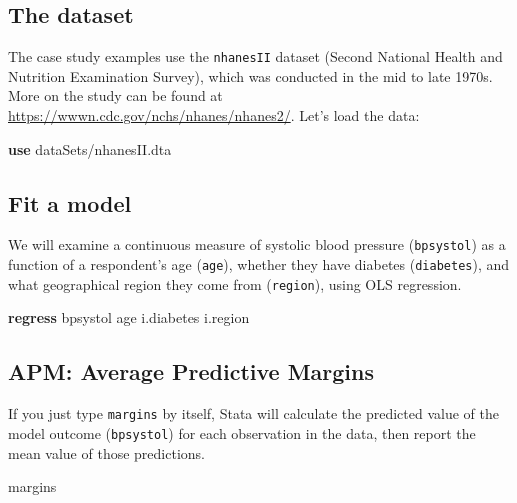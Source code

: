 \documentclass[
]{book}
\newenvironment{Shaded}{\begin{snugshade}}{\end{snugshade}}
\newcommand{\KeywordTok}[1]{\textcolor[rgb]{0.13,0.29,0.53}{\textbf{#1}}}
\newcommand{\NormalTok}[1]{#1}
\begin{document}
\hypertarget{the-dataset-2}{%
\subsection{The dataset}\label{the-dataset-2}}

The case study examples use the \texttt{nhanesII} dataset (Second National Health and Nutrition Examination Survey),
which was conducted in the mid to late 1970s. More on the study can be found at \url{https://wwwn.cdc.gov/nchs/nhanes/nhanes2/}. Let's load the data:

\begin{Shaded}
\begin{Highlighting}[]
\KeywordTok{use}\NormalTok{ dataSets/nhanesII.dta}
\end{Highlighting}
\end{Shaded}

\hypertarget{fit-a-model}{%
\subsection{Fit a model}\label{fit-a-model}}

We will examine a continuous measure of systolic blood pressure (\texttt{bpsystol}) as a function of a respondent's age (\texttt{age}), whether they have diabetes (\texttt{diabetes}), and what geographical region they come from (\texttt{region}), using OLS regression.

\begin{Shaded}
\begin{Highlighting}[]
\KeywordTok{regress}\NormalTok{ bpsystol age i.diabetes i.region}
\end{Highlighting}
\end{Shaded}

\hypertarget{apm-average-predictive-margins}{%
\subsection{APM: Average Predictive Margins}\label{apm-average-predictive-margins}}

If you just type \texttt{margins} by itself, Stata will calculate the predicted value of the model outcome (\texttt{bpsystol}) for each observation in the data, then report the mean value of those predictions.

\begin{Shaded}
\begin{Highlighting}[]
\NormalTok{margins}
\end{Highlighting}
\end{Shaded}
\end{document}
